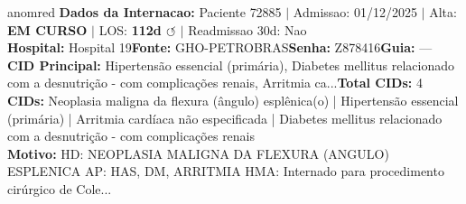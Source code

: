 \documentclass[a4paper,10pt]{article}
\begin{document}
\begin{anomalycard}[Internacao 157279 | GHO-PETROBRAS | CRITICO (z=5.25)]{anomred}
\textbf{Dados da Internacao:} Paciente 72885 $\mid$ Admissao: 01/12/2025 $\mid$ Alta: \textcolor{anomorange}{\textbf{EM CURSO}} $\mid$ LOS: \textbf{112d \textcolor{anomorange}{$\circlearrowleft$}} $\mid$ Readmissao 30d: Nao\\
\textbf{Hospital:} Hospital 19\quad\textbf{Fonte:} GHO-PETROBRAS\quad\textbf{Senha:} Z878416\quad\textbf{Guia:} ---\\
\textbf{CID Principal:} {\small Hipertensão essencial (primária), Diabetes mellitus relacionado com a desnutrição - com complicações renais, Arritmia ca...}\quad\textbf{Total CIDs:} 4\\

\textbf{CIDs:} {\scriptsize Neoplasia maligna da flexura (ângulo) esplênica(o) | Hipertensão essencial (primária) | Arritmia cardíaca não especificada | Diabetes mellitus relacionado com a desnutrição - com complicações renais}\\

\textbf{Motivo:} {\scriptsize HD: NEOPLASIA MALIGNA DA FLEXURA (ANGULO) ESPLENICA  AP: HAS, DM, ARRITMIA  HMA: Internado para procedimento cirúrgico de Cole...}\\


\end{anomalycard}
\end{document}

